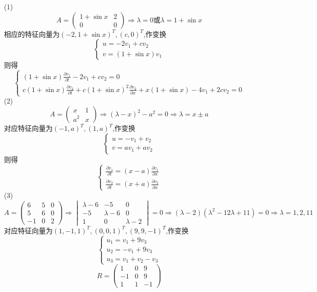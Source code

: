 \begin{solve}
  (1)\[A=\begin{pmatrix}
  1+\sin x&2\\0&0\end{pmatrix}\Rightarrow\lambda=0\mbox{或}\lambda=1+\sin x\]
  相应的特征向量为$(-2,1+\sin x)^T,(c,0)^T$,作变换
  \[\begin{cases}
  u=-2v_1+cv_2\\
  v=(1+\sin x)v_1
  \end{cases}\]
  则得
  \[\begin{cases}
  (1+\sin x)\frac{\partial v_1}{\partial t}-2v_1+cv_2=0\\
  c(1+\sin x)\frac{\partial v_2}{\partial t}+c(1+\sin x)^2\frac{\partial v_2}{\partial x}+x(1+\sin x)-4v_1+2cv_2=0
  \end{cases}\]
  (2)\[A=\begin{pmatrix}
  x&1\\a^2&x
  \end{pmatrix}\Rightarrow(\lambda-x)^2-a^2=0\Rightarrow\lambda=x\pm a\]
  对应特征向量为$(-1,a)^T,(1,a)^T$,作变换
  \[\begin{cases}
  u=-v_1+v_2\\
  v=av_1+av_2
  \end{cases}\]
  则得
  \[\begin{cases}
  \frac{\partial v_1}{\partial t}=(x-a)\frac{\partial v_1}{\partial x}\\
  \frac{\partial v_2}{\partial t}=(x+a)\frac{\partial v_2}{\partial x}
  \end{cases}\]
  (3)\[A=
  \begin{pmatrix}
  6&5&0\\5&6&0\\-1&0&2
  \end{pmatrix}\Rightarrow
  \begin{vmatrix}
  \lambda-6&-5&0\\-5&\lambda-6&0\\1&0&\lambda-2
  \end{vmatrix}=0\Rightarrow(\lambda-2)(\lambda^2-12\lambda+11)=0\Rightarrow\lambda=1,2,11\]
  对应特征向量为$(1,-1,1)^T,(0,0,1)^T,(9,9,-1)^T$,作变换
  \[\begin{cases}
  u_1=v_1+9v_3\\
  u_2=-v_1+9v_3\\
  u_3=v_1+v_2-v_3
  \end{cases}\]
  \[R=\begin{pmatrix}
  1&0&9\\-1&0&9\\1&1&-1

\end{pmatrix}\]
\end{solve}

